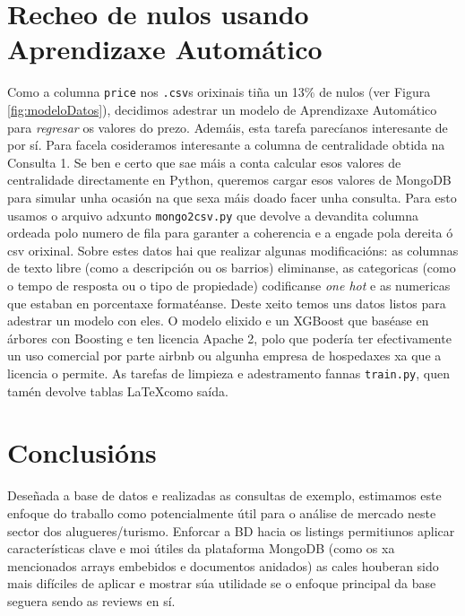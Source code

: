 \documentclass[12pt,a4paper]{article}
\begin{document}
\section{Recheo de nulos usando Aprendizaxe Automático}
\label{sec:nulosAA}


Como a columna \texttt{price} nos \texttt{.csv}s orixinais tiña un 13\% de nulos
(ver Figura \ref{fig:modeloDatos}), decidimos adestrar un modelo de Aprendizaxe
Automático para \emph{regresar} os valores do prezo. Ademáis, esta tarefa
parecíanos interesante de por sí. Para facela cosideramos interesante a columna
de centralidade obtida na Consulta 1. Se ben e certo que sae máis a conta
calcular esos valores de centralidade directamente en Python, queremos cargar
esos valores de MongoDB para simular unha ocasión na que sexa máis doado facer
unha consulta. Para esto usamos o arquivo adxunto \texttt{mongo2csv.py} que
devolve a devandita columna ordeada polo numero de fila para garanter a
coherencia e a engade pola dereita ó csv orixinal. Sobre estes datos hai que
realizar algunas modificacións: as columnas de texto libre (como a descripción
ou os barrios) eliminanse, as categoricas (como o tempo de resposta ou o tipo de
propiedade) codificanse \emph{one hot} e as numericas que estaban en porcentaxe
formatéanse. Deste xeito temos uns datos listos para adestrar un modelo con
eles. O modelo elixido e un XGBoost que baséase en árbores con Boosting e ten
licencia Apache 2, polo que podería ter efectivamente un uso comercial por parte
airbnb ou algunha empresa de hospedaxes xa que a licencia o permite. As tarefas
de limpieza e adestramento fannas \texttt{train.py}, quen tamén devolve tablas
\LaTeX como saída.






\section{Conclusións}
Deseñada a base de datos e realizadas as consultas de exemplo, estimamos este
enfoque do traballo como potencialmente útil para o análise de mercado neste
sector dos alugueres/turismo. Enforcar a BD hacia os listings permitiunos
aplicar características clave e moi útiles da plataforma MongoDB (como os xa
mencionados arrays embebidos e documentos anidados) as cales houberan sido mais
difíciles de aplicar e mostrar súa utilidade se o enfoque principal da base
seguera sendo as reviews en sí. \\
\end{document}
